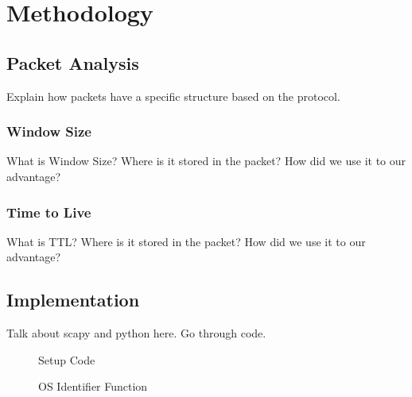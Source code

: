 \section{Methodology}

\subsection{Packet Analysis}
Explain how packets have a specific structure based on the protocol.

\subsubsection{Window Size}
What is Window Size? Where is it stored in the packet? How did we use it to our advantage?

\subsubsection{Time to Live}
What is TTL? Where is it stored in the packet? How did we use it to our advantage?

\subsection{Implementation}
Talk about scapy and python here.
Go through code.

\begin{figure}[p]
	\caption{\label{fig:setupCode} Setup Code}
\end{figure}

\begin{figure}[p]
	\caption{\label{fig:osFunction} OS Identifier Function}
\end{figure}


